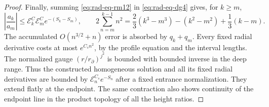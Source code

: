 \begin{proof}
Finally, summing \eqref{eq:rad-eq-rm12} in
\eqref{eq:rad-eq-dg4} gives, for $k\ge m$,
\begin{equation}\label{eq:rad-eq-rm17}
 \left|\frac{a_k}{a_m}\right|
 \le\mathcal E_k^C\mathcal E_m^C e^{-(S_k-S_m)},\qquad
 2\sum_{n=m}^{k-1}n^2
 =\frac23(k^3-m^3)-(k^2-m^2)+\frac13(k-m).
\end{equation}
The accumulated $O(n^{3/2}+n)$ error is absorbed by $q_k+q_m$.
Every fixed radial derivative costs at most $e^{C_sn^2}$, by the
profile equation and the interval lengths.  The normalized gauge
$(r/r_\partial)^{j^2}$ is bounded with bounded inverse in the deep
range.  Thus the constructed homogeneous solution and all its fixed
radial derivatives are bounded by $\mathcal E_n^{C_s}e^{-S_n}$
after a fixed entrance normalization.  They extend flatly at the
endpoint.  The same contraction also shows continuity of the endpoint
line in the product topology of all the height ratios.
\end{proof}

